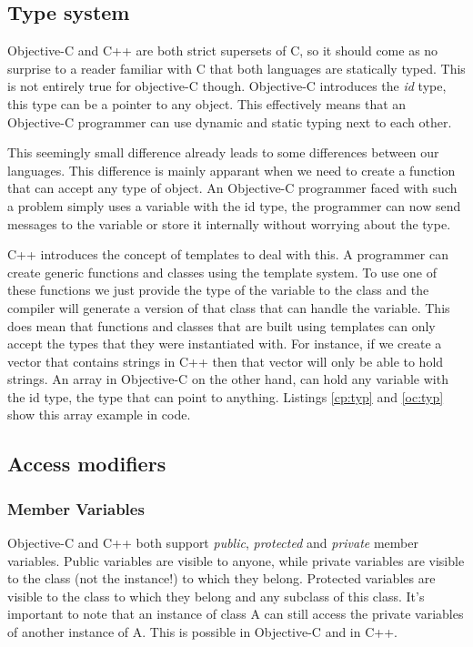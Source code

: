 \documentclass[12pt, a4paper, twocolumn]{article}
\begin{document}
\subsection{Type system}
\label{sec:types}

Objective-C and C++ are both strict supersets of C, so it should come as no surprise to a reader familiar with C that both languages are statically typed. This is not entirely true for objective-C though. Objective-C introduces the \textit{id} type, this type can be a pointer to any object. This effectively means that an Objective-C programmer can use dynamic and static typing next to each other. 

This seemingly small difference already leads to some differences between our languages. This difference is mainly apparant when we need to create a function that can accept any type of object. An Objective-C programmer faced with such a problem simply uses a variable with the id type, the programmer can now send messages to the variable or store it internally without worrying about the type.

C++ introduces the concept of templates to deal with this. A programmer can create generic functions and classes using the template system. To use one of these functions we just provide the type of the variable to the class and the compiler will generate a version of that class that can handle the variable. This does mean that functions and classes that are built using templates can only accept the types that they were instantiated with. For instance, if we create a vector that contains strings in C++ then that vector will only be able to hold strings. An array in Objective-C on the other hand, can hold any variable with the id type, the type that can point to anything. Listings \ref{cp:typ} and \ref{oc:typ} show this array example in code.

\subsection{Access modifiers}
\label{sec:access}
\subsubsection{Member Variables}
Objective-C and C++ both support \textit{public}, \textit{protected} and \textit{private} member variables. Public variables are visible to anyone, while private variables are visible to the class (not the instance!) to which they belong. Protected variables are visible to the class to which they belong and any subclass of this class. It's important to note that an instance of class A can still access the private variables of another instance of A. This is possible in Objective-C and in C++.
\end{document}
